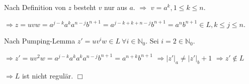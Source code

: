 \begin{enumerate}
{{      Nach Definition von $z$ besteht $v$ nur aus $a$. $\Rightarrow$ $v = a^k, 1 \leq k \leq n$.

      $\Rightarrow z = uvw = a^{j-k}a^{k}a^{n-j}b^{n+1} = a^{j-k+k+n-j}b^{n+1} = a^{n}b^{n+1} \in L, k \leq j \leq n$.

      Nach Pumping-Lemma $z' = uv^{i}w \in L \  \forall i \in \mathbb{N}_0$.
      Sei $i=2 \in \mathbb{N}_0$.

      $\Rightarrow z' = uv^{2}w = a^{j-k}a^{k}a^{k}a^{n-j}b^{n+1} = a^{n+k}b^{n+1} $
      $\Rightarrow |z'|_a \neq |z'|_b + 1 $
      $\Rightarrow z' \notin L$ \Large\lightning\normalsize

      $\Rightarrow L$ ist nicht regulär. $\Box$
    }{}
  }
\end{enumerate}